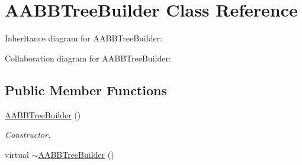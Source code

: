 \hypertarget{class_a_a_b_b_tree_builder}{\section{A\+A\+B\+B\+Tree\+Builder Class Reference}
\label{class_a_a_b_b_tree_builder}
}


Inheritance diagram for A\+A\+B\+B\+Tree\+Builder\+:


Collaboration diagram for A\+A\+B\+B\+Tree\+Builder\+:
\subsection*{Public Member Functions}
\begin{DoxyCompactItemize}
\item 
\hypertarget{class_a_a_b_b_tree_builder_a892c7e33c261342a6eee3f41e8f4f014}{\hyperlink{class_a_a_b_b_tree_builder_a892c7e33c261342a6eee3f41e8f4f014}{A\+A\+B\+B\+Tree\+Builder} ()}\label{class_a_a_b_b_tree_builder_a892c7e33c261342a6eee3f41e8f4f014}

\begin{DoxyCompactList}\small\item\em Constructor. \end{DoxyCompactList}\item 
\hypertarget{class_a_a_b_b_tree_builder_a0ad3a7a7585ea8f917a4c9d807bab481}{virtual \hyperlink{class_a_a_b_b_tree_builder_a0ad3a7a7585ea8f917a4c9d807bab481}{$\sim$\+A\+A\+B\+B\+Tree\+Builder} ()}\label{class_a_a_b_b_tree_builder_a0ad3a7a7585ea8f917a4c9d807bab481}


\end{DoxyCompactItemize}
